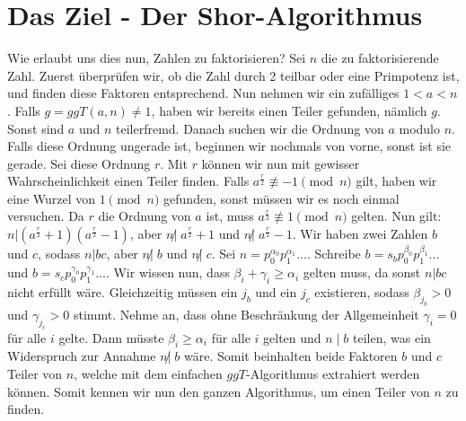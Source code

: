 \section{Das Ziel - Der Shor-Algorithmus}
Wie erlaubt uns dies nun, Zahlen zu faktorisieren? Sei $n$ die zu faktorisierende Zahl. Zuerst überprüfen wir, ob die Zahl durch 2 teilbar oder eine Primpotenz ist, und finden diese Faktoren entsprechend. Nun nehmen wir ein zufälliges $1 < a < n$. Falls $g = ggT(a, n) \neq 1$, haben wir bereits einen Teiler gefunden, nämlich $g$. Sonst sind $a$ und $n$ teilerfremd. Danach suchen wir die Ordnung von $a$ modulo $n$. Falls diese Ordnung ungerade ist, beginnen wir nochmals von vorne, sonst ist sie gerade. Sei diese Ordnung $r$. Mit $r$ können wir nun mit gewisser Wahrscheinlichkeit einen Teiler finden. Falls $a^{\frac{r}{2}} \not\equiv -1 \pmod n$ gilt, haben wir eine Wurzel von $1 \pmod{n}$ gefunden, sonst müssen wir es noch einmal versuchen. Da $r$ die Ordnung von $a$ ist, muss $a^{\frac{r}{2}}\not\equiv 1 \pmod{n}$ gelten. Nun gilt: $n | (a^\frac{r}{2} + 1)(a^\frac{r}{2} - 1)$, aber $n \not| \; a^\frac{r}{2} + 1$ und $n \not| \; a^\frac{r}{2} - 1$. Wir haben zwei Zahlen $b$ und $c$, sodass $n | bc$, aber $n \not | \; b$ und $n \not | \; c$. Sei $n = p_0^{\alpha_0}p_1^{\alpha_1}...$. Schreibe $b = s_bp_0^{\beta_0}p_1^{\beta_1}...$ und $b = s_cp_0^{\gamma_0}p_1^{\gamma_1}...$. Wir wissen nun, dass $\beta_i + \gamma_i \geq \alpha_i$ gelten muss, da sonst $n | bc$ nicht erfüllt wäre. Gleichzeitig müssen ein $j_b$ und ein $j_c$ existieren, sodass $\beta_{j_b} > 0$ und $\gamma_{j_c} > 0$ stimmt. Nehme an, dass ohne Beschränkung der Allgemeinheit $\gamma_i = 0$ für alle $i$ gelte. Dann müsste $\beta_i \geq \alpha_i$ für alle $i$ gelten und $n \; | \; b$ teilen, was ein Widerspruch zur Annahme $n \not | \; b$ wäre. Somit beinhalten beide Faktoren $b$ und $c$ Teiler von $n$, welche mit dem einfachen $ggT$-Algorithmus extrahiert werden können. Somit kennen wir nun den ganzen Algorithmus, um einen Teiler von $n$ zu finden.
